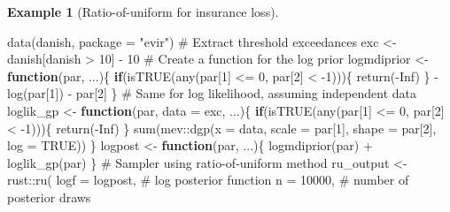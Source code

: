 \documentclass[
  11pt,
  letterpaper,
]{scrbook}
\newenvironment{Shaded}{\begin{snugshade}}{\end{snugshade}}
\newcommand{\AttributeTok}[1]{\textcolor[rgb]{0.40,0.45,0.13}{#1}}
\newcommand{\CommentTok}[1]{\textcolor[rgb]{0.37,0.37,0.37}{#1}}
\newcommand{\ConstantTok}[1]{\textcolor[rgb]{0.56,0.35,0.01}{#1}}
\newcommand{\ControlFlowTok}[1]{\textcolor[rgb]{0.00,0.23,0.31}{\textbf{#1}}}
\newcommand{\DecValTok}[1]{\textcolor[rgb]{0.68,0.00,0.00}{#1}}
\newcommand{\FunctionTok}[1]{\textcolor[rgb]{0.28,0.35,0.67}{#1}}
\newcommand{\NormalTok}[1]{\textcolor[rgb]{0.00,0.23,0.31}{#1}}
\newcommand{\OtherTok}[1]{\textcolor[rgb]{0.00,0.23,0.31}{#1}}
\newcommand{\SpecialCharTok}[1]{\textcolor[rgb]{0.37,0.37,0.37}{#1}}
\newcommand{\StringTok}[1]{\textcolor[rgb]{0.13,0.47,0.30}{#1}}
\theoremstyle{definition}
\newtheorem{example}{Example}[chapter]
\theoremstyle{plain}
\theoremstyle{plain}
\theoremstyle{plain}
\theoremstyle{definition}
\theoremstyle{definition}
\theoremstyle{plain}
\theoremstyle{plain}
\theoremstyle{remark}
\begin{document}
\begin{example}[Ratio-of-uniform for insurance
loss]
\begin{Shaded}
\begin{Highlighting}[]
\FunctionTok{data}\NormalTok{(danish, }\AttributeTok{package =} \StringTok{"evir"}\NormalTok{)}
\CommentTok{\# Extract threshold exceedances}
\NormalTok{exc }\OtherTok{\textless{}{-}}\NormalTok{ danish[danish }\SpecialCharTok{\textgreater{}} \DecValTok{10}\NormalTok{] }\SpecialCharTok{{-}} \DecValTok{10}
\CommentTok{\# Create a function for the log prior}
\NormalTok{logmdiprior }\OtherTok{\textless{}{-}} \ControlFlowTok{function}\NormalTok{(par, ...)\{}
  \ControlFlowTok{if}\NormalTok{(}\FunctionTok{isTRUE}\NormalTok{(}\FunctionTok{any}\NormalTok{(par[}\DecValTok{1}\NormalTok{] }\SpecialCharTok{\textless{}=} \DecValTok{0}\NormalTok{, par[}\DecValTok{2}\NormalTok{] }\SpecialCharTok{\textless{}} \SpecialCharTok{{-}}\DecValTok{1}\NormalTok{)))\{}
    \FunctionTok{return}\NormalTok{(}\SpecialCharTok{{-}}\ConstantTok{Inf}\NormalTok{)}
\NormalTok{  \}}
  \SpecialCharTok{{-}}\FunctionTok{log}\NormalTok{(par[}\DecValTok{1}\NormalTok{]) }\SpecialCharTok{{-}}\NormalTok{ par[}\DecValTok{2}\NormalTok{]}
\NormalTok{\}}
\CommentTok{\# Same for log likelihood, assuming independent data}
\NormalTok{loglik\_gp }\OtherTok{\textless{}{-}} \ControlFlowTok{function}\NormalTok{(par, }\AttributeTok{data =}\NormalTok{ exc, ...)\{}
  \ControlFlowTok{if}\NormalTok{(}\FunctionTok{isTRUE}\NormalTok{(}\FunctionTok{any}\NormalTok{(par[}\DecValTok{1}\NormalTok{] }\SpecialCharTok{\textless{}=} \DecValTok{0}\NormalTok{, par[}\DecValTok{2}\NormalTok{] }\SpecialCharTok{\textless{}} \SpecialCharTok{{-}}\DecValTok{1}\NormalTok{)))\{}
    \FunctionTok{return}\NormalTok{(}\SpecialCharTok{{-}}\ConstantTok{Inf}\NormalTok{)}
\NormalTok{  \}}
  \FunctionTok{sum}\NormalTok{(mev}\SpecialCharTok{::}\FunctionTok{dgp}\NormalTok{(}\AttributeTok{x =}\NormalTok{ data, }\AttributeTok{scale =}\NormalTok{ par[}\DecValTok{1}\NormalTok{], }\AttributeTok{shape =}\NormalTok{ par[}\DecValTok{2}\NormalTok{], }\AttributeTok{log =} \ConstantTok{TRUE}\NormalTok{))}
\NormalTok{\}}
\NormalTok{logpost }\OtherTok{\textless{}{-}} \ControlFlowTok{function}\NormalTok{(par, ...)\{}
  \FunctionTok{logmdiprior}\NormalTok{(par) }\SpecialCharTok{+} \FunctionTok{loglik\_gp}\NormalTok{(par)}
\NormalTok{\}}
\CommentTok{\# Sampler using ratio{-}of{-}uniform method}
\NormalTok{ru\_output }\OtherTok{\textless{}{-}}\NormalTok{ rust}\SpecialCharTok{::}\FunctionTok{ru}\NormalTok{(}
  \AttributeTok{logf =}\NormalTok{ logpost,  }\CommentTok{\# log posterior function}
  \AttributeTok{n =} \DecValTok{10000}\NormalTok{, }\CommentTok{\# number of posterior draws}

\end{Highlighting}
\end{Shaded}
\end{example}
\end{document}
